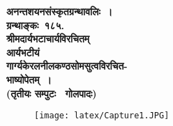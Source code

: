 \documentclass[11pt, openany]{book}
\begin{document}
\thispagestyle{empty}
\begin{center}

\vspace{0.6cm}
\large\textbf{अनन्तशयनसंस्कृतग्रन्थावलिः~।} \\
\vspace{0.6cm}
\textbf{ग्रन्थाङ्कः~१८५.} \\
\vspace{0.6cm}
{\Large\textbf{श्रीमदार्यभटाचार्यविरचितम् }}\\
\vspace{3mm}
\Huge\textbf{आर्यभटीयं}\\
\vspace{3mm}
\Large\textbf{गार्ग्यकेरलनीलकण्ठसोमसुत्वविरचित-} \\
\vspace{2mm}
\Large\textbf{भाष्योपेतम्~।} \\
\vspace{0.4cm}
\textbf{(तृतीयः सम्पुटः \textendash\ गोलपादः)}\\
\end{center}

\begin{figure}[h!]
   \centering
  \texttt{[image: latex/Capture1.JPG]}
\end{figure}
\end{document}
